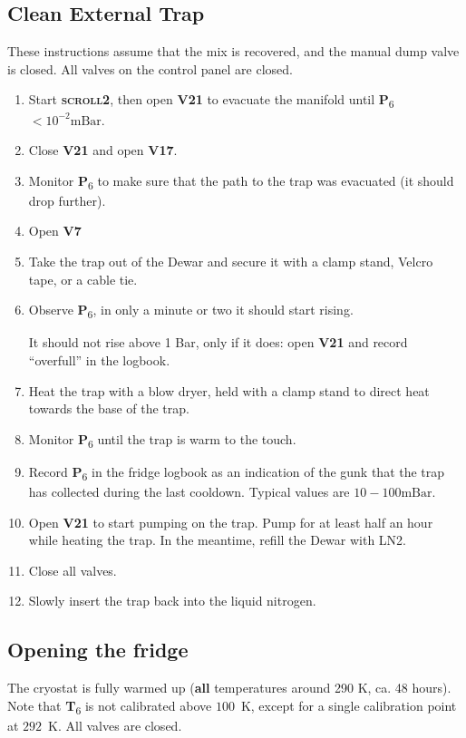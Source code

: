 \documentclass{article}[18pt,A4]
\newcommand{\mBar}{\mathrm{mBar}}
\newcommand{\thing}[1]{{\color{gray}\textsc{ \textbf{#1}}}}
\newcommand{\valve}[1]{{\color{gray}\textbf{V#1}}}
\newcommand{\pressure}[1]{{\color{pressurecolor}\textbf{P}\textsubscript{#1}}}
\newcommand{\temperature}[1]{{\color{temperaturecolor}\textbf{T}\textsubscript{#1}}}
\begin{document}
\subsection{Clean External Trap} \label{sec:external_trap}
These instructions assume that the mix is recovered, and the manual dump valve is closed.
All valves on the control panel are closed. 
\begin{enumerate}
    \item Start \thing{scroll2}, then open \valve{21} to evacuate the manifold until
    \pressure{6} $< 10^{-2} \mBar$. 
    \item Close \valve{21} and open \valve{17}.
    \item Monitor \pressure{6} to make sure that the path to the trap was evacuated (it should drop further). 
    \item Open \valve{7}
    \item Take the trap out of the Dewar and secure it with a clamp stand, Velcro tape, or a cable tie.
    \item Observe \pressure{6}, in only a minute or two it should start rising.
    
    It should not rise above 1 Bar, only if it does: open \valve{21} and record ``overfull'' in the logbook.

    \item Heat the trap with a blow dryer, held with a clamp stand to direct heat towards the base of the trap.
    
    \item Monitor \pressure{6} until the trap is warm to the touch.
    \item Record \pressure{6} in the fridge logbook as an indication of the gunk that the trap has collected during the last cooldown.
    Typical values are $10-100\mBar$.
    \item Open \valve{21} to start pumping on the trap.
    Pump for at least half an hour while heating the trap. In the meantime, refill the Dewar with LN2.
    \item Close all valves.
    \item Slowly insert the trap back into the liquid nitrogen.
\end{enumerate}

\newpage
\subsection{Opening the fridge}
The cryostat is fully warmed up (\textbf{all} temperatures around 290 K, ca. 48 hours). Note that \temperature{6} is not calibrated above $100$~K,
except for a single calibration point at $292$~K. All valves are closed.
\end{document}

